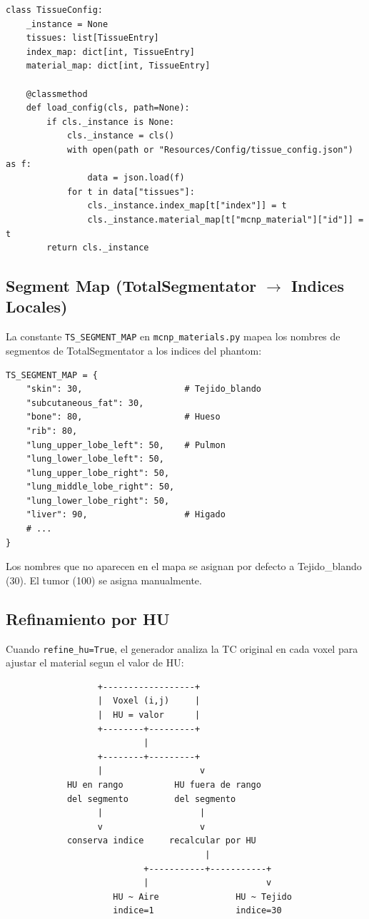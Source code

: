 \documentclass[12pt,a4paper]{article}
\begin{document}
\begin{verbatim}
class TissueConfig:
    _instance = None
    tissues: list[TissueEntry]
    index_map: dict[int, TissueEntry]
    material_map: dict[int, TissueEntry]

    @classmethod
    def load_config(cls, path=None):
        if cls._instance is None:
            cls._instance = cls()
            with open(path or "Resources/Config/tissue_config.json") as f:
                data = json.load(f)
            for t in data["tissues"]:
                cls._instance.index_map[t["index"]] = t
                cls._instance.material_map[t["mcnp_material"]["id"]] = t
        return cls._instance
\end{verbatim}

\subsection{Segment Map (TotalSegmentator $\to$ Indices Locales)}

La constante \texttt{TS\_SEGMENT\_MAP} en \texttt{mcnp\_materials.py} mapea los nombres de segmentos de TotalSegmentator a los indices del phantom:

\begin{verbatim}
TS_SEGMENT_MAP = {
    "skin": 30,                    # Tejido_blando
    "subcutaneous_fat": 30,
    "bone": 80,                    # Hueso
    "rib": 80,
    "lung_upper_lobe_left": 50,    # Pulmon
    "lung_lower_lobe_left": 50,
    "lung_upper_lobe_right": 50,
    "lung_middle_lobe_right": 50,
    "lung_lower_lobe_right": 50,
    "liver": 90,                   # Higado
    # ...
}
\end{verbatim}

Los nombres que no aparecen en el mapa se asignan por defecto a Tejido\_blando (30). El tumor (100) se asigna manualmente.

\subsection{Refinamiento por HU}

Cuando \texttt{refine\_hu=True}, el generador analiza la TC original en cada voxel para ajustar el material segun el valor de HU:

\begin{verbatim}
                  +------------------+
                  |  Voxel (i,j)     |
                  |  HU = valor      |
                  +--------+---------+
                           |
                  +--------+---------+
                  |                   v
            HU en rango          HU fuera de rango
            del segmento         del segmento
                  |                   |
                  v                   v
            conserva indice     recalcular por HU
                                       |
                           +-----------+-----------+
                           |                       v
                     HU ~ Aire               HU ~ Tejido
                     indice=1                indice=30
\end{verbatim}
\end{document}
